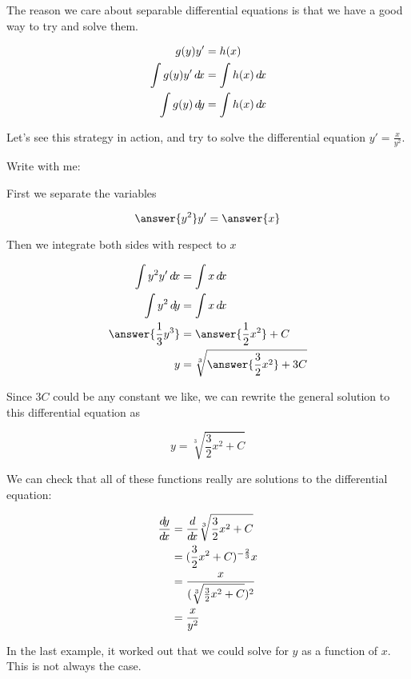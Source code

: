\documentclass{ximera}
\begin{document}
\begin{example}
	The reason we care about separable differential equations is that we have a good way to try and solve them.  
		
	\begin{align*}
		g(y)y'  &= h(x)\\
		\int g(y) y' \d x &= \int h(x) \d x\\
		\int g(y) \d y &= \int h(x) \d x
	\end{align*}
	
	Let's see this strategy in action, and try to solve the differential equation $y' = \frac{x}{y^2}$.
	
	Write with me:
	
	First we separate the variables
	
	\[
	\answer{y^2} y' = \answer{x}
	\]
	
	Then we integrate both sides with respect to $x$
	
	\begin{align*}
	\int y^2 y' \d x &= \int x \d x\\
	\int y^2 \d y &= \int x \d x\\
	\answer{\frac{1}{3} y^3} &= \answer{\frac{1}{2}x^2}+C\\
	y &= \sqrt[3]{\answer{\frac{3}{2}x^2}+3C}
	\end{align*}
	
	Since $3C$ could be any constant we like, we can rewrite the general solution to this differential equation as 
	
	\[
	y = \sqrt[3]{\frac{3}{2}x^2+C}
	\]
	
	We can check that all of these functions really are solutions to the differential equation:
	
	\begin{align*}
		\frac{\mathop{}\!d\! y}{\mathop{}\!d\! x} &= \frac{d}{\mathop{}\!d\! x} \sqrt[3]{\frac{3}{2}x^2+C}\\
			&=(\frac{3}{2}x^2+C)^{-\frac{2}{3}} x\\
			&= \frac{x}{(\sqrt[3]{\frac{3}{2}x^2+C})^2}\\
			&= \frac{x}{y^2}
	\end{align*}
\end{example}


In the last example, it worked out that we could solve for $y$ as a function of $x$.  This is not always the case.
\end{document}
